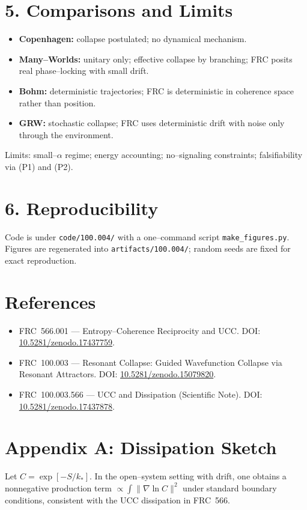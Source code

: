 \documentclass[10pt]{article}
\begin{document}
\section*{5. Comparisons and Limits}
\begin{itemize}
  \item \textbf{Copenhagen:} collapse postulated; no dynamical mechanism.
  \item \textbf{Many--Worlds:} unitary only; effective collapse by branching; FRC posits real phase--locking with small drift.
  \item \textbf{Bohm:} deterministic trajectories; FRC is deterministic in coherence space rather than position.
  \item \textbf{GRW:} stochastic collapse; FRC uses deterministic drift with noise only through the environment.
\end{itemize}
Limits: small--$\alpha$ regime; energy accounting; no--signaling constraints; falsifiability via (P1) and (P2).

\section*{6. Reproducibility}
Code is under \verb|code/100.004/| with a one--command script \verb|make_figures.py|. Figures are regenerated into \verb|artifacts/100.004/|; random seeds are fixed for exact reproduction.

\section*{References}
\small
\begin{itemize}
  \item FRC~566.001 — Entropy--Coherence Reciprocity and UCC. DOI: \href{https://doi.org/10.5281/zenodo.17437759}{10.5281/zenodo.17437759}.
  \item FRC~100.003 — Resonant Collapse: Guided Wavefunction Collapse via Resonant Attractors. DOI: \href{https://doi.org/10.5281/zenodo.15079820}{10.5281/zenodo.15079820}.
  \item FRC~100.003.566 — UCC and Dissipation (Scientific Note). DOI: \href{https://doi.org/10.5281/zenodo.17437878}{10.5281/zenodo.17437878}.
\end{itemize}

\section*{Appendix A: Dissipation Sketch}
Let $C=\exp[-S/k_*]$. In the open--system setting with drift, one obtains a nonnegative production term $\propto \int\!\|\nabla\ln C\|^2$ under standard boundary conditions, consistent with the UCC dissipation in FRC~566.
\end{document}

